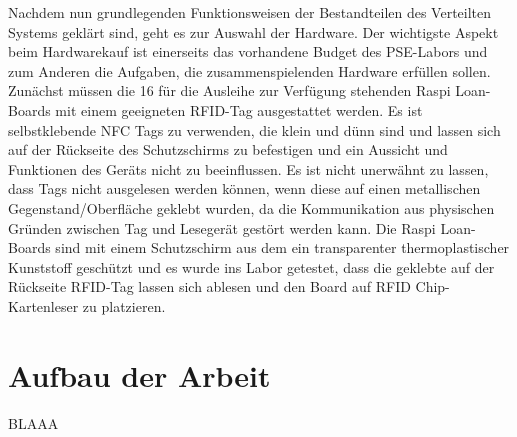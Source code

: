 Nachdem nun grundlegenden Funktionsweisen der Bestandteilen des Verteilten Systems geklärt sind, geht es zur Auswahl der Hardware. Der wichtigste Aspekt beim Hardwarekauf ist einerseits das vorhandene Budget des PSE-Labors und zum Anderen die Aufgaben, die zusammenspielenden Hardware erfüllen sollen. Zunächst müssen die 16 für die Ausleihe zur Verfügung stehenden Raspi Loan-Boards mit einem geeigneten RFID-Tag ausgestattet werden. Es ist selbstklebende NFC Tags zu verwenden, die klein und dünn sind und lassen sich auf der Rückseite des Schutzschirms zu befestigen und ein Aussicht und Funktionen des Geräts nicht zu beeinflussen. Es ist nicht unerwähnt zu lassen, dass Tags nicht ausgelesen werden können, wenn diese auf einen metallischen Gegenstand/Oberfläche geklebt wurden, da die Kommunikation aus physischen Gründen zwischen Tag und Lesegerät gestört werden kann. Die Raspi Loan-Boards sind mit einem Schutzschirm aus dem ein transparenter thermoplastischer Kunststoff geschützt und es wurde ins Labor getestet, dass die geklebte auf der Rückseite RFID-Tag lassen sich ablesen und den Board auf RFID Chip-Kartenleser zu platzieren. 

\section{Aufbau der Arbeit}
\label{sec:intro:themengebiet}
BLAAA 



 
 